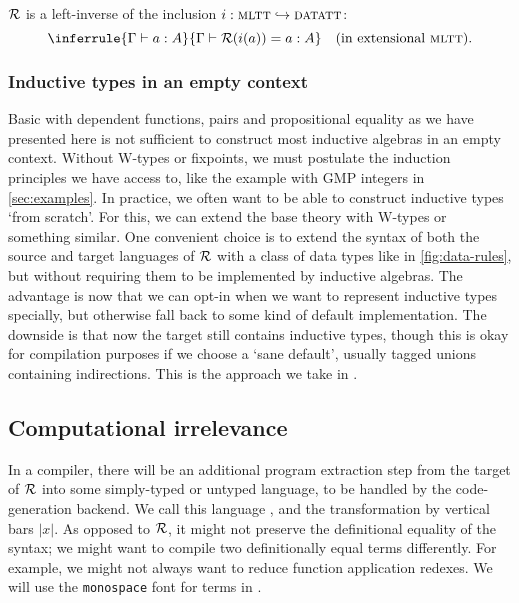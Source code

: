\begin{theorem}
    $\mathcal{R}$ is a left-inverse of the inclusion $i : {\textsc{mltt}}
    \hookrightarrow {\textsc{datatt}}$:
    \[
    \inferrule{\Gamma \vdash a : A}{\Gamma \vdash \R(i(a)) = a : A} \quad \text{(in extensional \lambdamltt)}.
    \]
\end{theorem}

\subsubsection{Inductive types in an empty context}

Basic \lambdamltt with dependent functions, pairs and propositional equality as
we have presented here is not sufficient to construct most inductive algebras in
an empty context. Without W-types or fixpoints, we must postulate the induction
principles we have access to, like the example with GMP integers in
\cref{sec:examples}. In practice, we often want to be able to construct
inductive types `from scratch'. For this, we can extend the base theory
with W-types or something similar. One convenient choice is to extend
the syntax of both the source and target languages of $\mathcal{R}$ with a class of data
types like in \cref{fig:data-rules}, but without requiring them to be
implemented by inductive algebras. The advantage is now that we can opt-in when
we want to represent inductive types specially, but otherwise fall back to some
kind of default implementation. The downside is that now the target still
contains inductive types, though this is okay for compilation purposes if we
choose a `sane default', usually tagged unions containing indirections. This is
the approach we take in \superfluid.

\subsection{Computational irrelevance}\label{sub:irr}

In a compiler, there will be an additional program extraction step from the
target of $\mathcal{R}$ into some simply-typed or untyped language, to be handled by the
code-generation backend. We call this language \lambdaprog, and the transformation by
vertical bars $|x|$. As opposed to $\mathcal{R}$, it might not preserve the definitional
equality of the syntax; we might want to compile two definitionally equal terms
differently. For example, we might not always want to reduce function
application redexes. We will use the \texttt{monospace} font for terms in
\lambdaprog.


